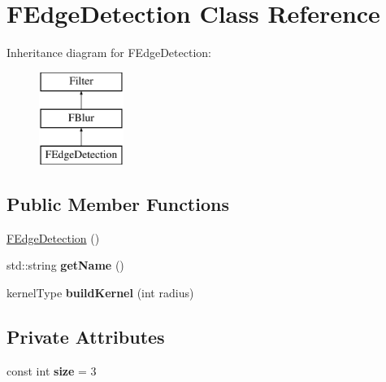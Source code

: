 \hypertarget{classFEdgeDetection}{\section{F\-Edge\-Detection Class Reference}
\label{classFEdgeDetection}
}
Inheritance diagram for F\-Edge\-Detection\-:\begin{figure}[H]
\begin{center}
\leavevmode
\includegraphics[height=3.000000cm]{classFEdgeDetection}
\end{center}
\end{figure}
\subsection*{Public Member Functions}
\begin{DoxyCompactItemize}
\item 
\hyperlink{classFEdgeDetection_a61d17b41dd0dc652073b10e3095785e5}{F\-Edge\-Detection} ()
\item 
\hypertarget{classFEdgeDetection_acdf7ec56e2f1f5010b84ebcd66a958f3}{std\-::string {\bfseries get\-Name} ()}\label{classFEdgeDetection_acdf7ec56e2f1f5010b84ebcd66a958f3}

\item 
\hypertarget{classFEdgeDetection_a58c541bf60eb4e21bdb656bdad5f8c65}{kernel\-Type {\bfseries build\-Kernel} (int radius)}\label{classFEdgeDetection_a58c541bf60eb4e21bdb656bdad5f8c65}

\end{DoxyCompactItemize}
\subsection*{Private Attributes}
\begin{DoxyCompactItemize}
\item 
\hypertarget{classFEdgeDetection_a33956c80b380d6633182e6c4527ed3d3}{const int {\bfseries size} = 3}\label{classFEdgeDetection_a33956c80b380d6633182e6c4527ed3d3}

\end{DoxyCompactItemize}


